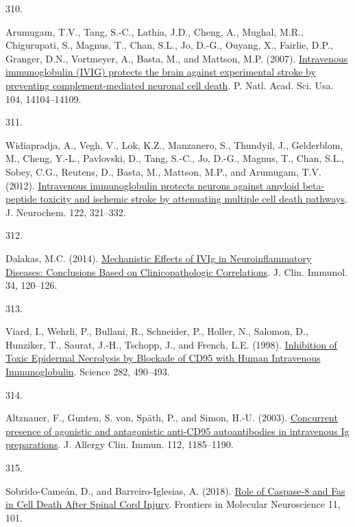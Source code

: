 \documentclass[
]{article}
\newlength{\cslhangindent}
\newlength{\csllabelwidth}
\newlength{\cslentryspacingunit} %
\newenvironment{CSLReferences}[2] %
 {%
  \setlength{\parindent}{0pt}
  \ifodd #1
  \let\oldpar\par
  \def\par{\hangindent=\cslhangindent\oldpar}
  \fi
  \setlength{\parskip}{#2\cslentryspacingunit}
 }%
 {}
\newcommand{\CSLLeftMargin}[1]{\parbox[t]{\csllabelwidth}{#1}}
\newcommand{\CSLRightInline}[1]{\parbox[t]{\linewidth - \csllabelwidth}{#1}\break}
\begin{document}
\begin{CSLReferences}{0}{0}
\leavevmode{}%
\CSLLeftMargin{310. }
\CSLRightInline{Arumugam, T.V., Tang, S.-C., Lathia, J.D., Cheng, A., Mughal, M.R., Chigurupati, S., Magnus, T., Chan, S.L., Jo, D.-G., Ouyang, X., Fairlie, D.P., Granger, D.N., Vortmeyer, A., Basta, M., and Mattson, M.P. (2007). \href{https://doi.org/10.1073/pnas.0700506104}{Intravenous immunoglobulin ({IVIG}) protects the brain against experimental stroke by preventing complement-mediated neuronal cell death}. P. Natl. Acad. Sci. Usa. 104, 14104--14109.}

\leavevmode{}%
\CSLLeftMargin{311. }
\CSLRightInline{Widiapradja, A., Vegh, V., Lok, K.Z., Manzanero, S., Thundyil, J., Gelderblom, M., Cheng, Y.-L., Pavlovski, D., Tang, S.-C., Jo, D.-G., Magnus, T., Chan, S.L., Sobey, C.G., Reutens, D., Basta, M., Mattson, M.P., and Arumugam, T.V. (2012). \href{https://doi.org/10.1111/j.1471-4159.2012.07754.x}{Intravenous immunoglobulin protects neurons against amyloid beta-peptide toxicity and ischemic stroke by attenuating multiple cell death pathways}. J. Neurochem. 122, 321--332.}

\leavevmode{}%
\CSLLeftMargin{312. }
\CSLRightInline{Dalakas, M.C. (2014). \href{https://doi.org/10.1007/s10875-014-0024-5}{Mechanistic {Effects} of {IVIg} in {Neuroinflammatory Diseases}: {Conclusions Based} on {Clinicopathologic Correlations}}. J. Clin. Immunol. 34, 120--126.}

\leavevmode{}%
\CSLLeftMargin{313. }
\CSLRightInline{Viard, I., Wehrli, P., Bullani, R., Schneider, P., Holler, N., Salomon, D., Hunziker, T., Saurat, J.-H., Tschopp, J., and French, L.E. (1998). \href{https://doi.org/10.1126/science.282.5388.490}{Inhibition of {Toxic Epidermal Necrolysis} by {Blockade} of {CD95} with {Human Intravenous Immunoglobulin}}. Science 282, 490--493.}

\leavevmode{}%
\CSLLeftMargin{314. }
\CSLRightInline{Altznauer, F., Gunten, S. von, Späth, P., and Simon, H.-U. (2003). \href{https://doi.org/10.1016/j.jaci.2003.09.045}{Concurrent presence of agonistic and antagonistic anti-{CD95} autoantibodies in intravenous {Ig} preparations}. J. Allergy Clin. Immun. 112, 1185--1190.}

\leavevmode{}%
\CSLLeftMargin{315. }
\CSLRightInline{Sobrido-Cameán, D., and Barreiro-Iglesias, A. (2018). \href{https://doi.org/10.3389/fnmol.2018.00101}{Role of {Caspase-8} and {Fas} in {Cell Death After Spinal Cord Injury}}. Frontiers in Molecular Neuroscience 11, 101.}


\end{CSLReferences}
\end{document}
